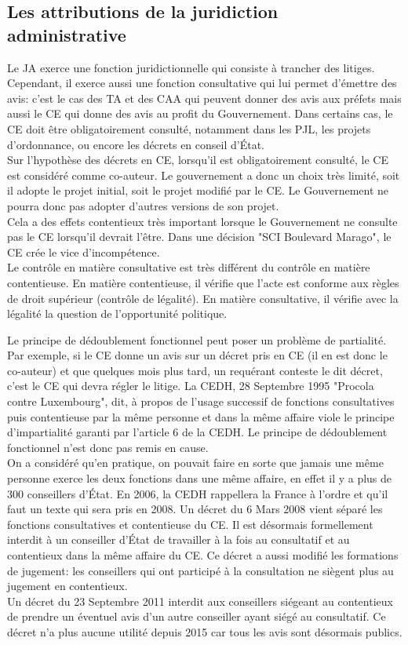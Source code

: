\documentclass[10pt, a4paper, openany]{book}
\begin{document}
\subsection{Les attributions de la juridiction administrative}

Le JA exerce une fonction juridictionnelle qui consiste à trancher des litiges. Cependant, il exerce aussi une fonction consultative qui lui permet d'émettre des avis: c'est le cas des TA et des CAA qui peuvent donner des avis aux préfets mais aussi le CE qui donne des avis au profit du Gouvernement. Dans certains cas, le CE doit être obligatoirement consulté, notamment dans les PJL, les projets d'ordonnance, ou encore les décrets en conseil d'État. \\
Sur l'hypothèse des décrets en CE, lorsqu'il est obligatoirement consulté, le CE est considéré comme co-auteur. Le gouvernement a donc un choix très limité, soit il adopte le projet initial, soit le projet modifié par le CE. Le Gouvernement ne pourra donc pas adopter d'autres versions de son projet. \\
Cela a des effets contentieux très important lorsque le Gouvernement ne consulte pas le CE lorsqu'il devrait l'être. Dans une décision "SCI Boulevard Marago", le CE crée le vice d'incompétence. \\
Le contrôle en matière consultative est très différent du contrôle en matière contentieuse. En matière contentieuse, il vérifie que l'acte est conforme aux règles de droit supérieur (contrôle de légalité). En matière consultative, il vérifie avec la légalité la question de l'opportunité politique. 


Le principe de dédoublement fonctionnel peut poser un problème de partialité. Par exemple, si le CE donne un avis sur un décret pris en CE (il en est donc le co-auteur) et que quelques mois plus tard, un requérant conteste le dit décret, c'est le CE qui devra régler le litige. La CEDH, 28 Septembre 1995 "Procola contre Luxembourg", dit, à propos de l'usage successif de fonctions consultatives puis contentieuse par la même personne et dans la même affaire viole le principe d'impartialité garanti par l'article 6 de la CEDH. Le principe de dédoublement fonctionnel n'est donc pas remis en cause. \\
On a considéré qu'en pratique, on pouvait faire en sorte que jamais une même personne exerce les deux fonctions dans une même affaire, en effet il y a plus de 300 conseillers d'État. En 2006, la CEDH rappellera la France à l'ordre et qu'il faut un texte qui sera pris en 2008. Un décret du 6 Mars 2008 vient séparé les fonctions consultatives et contentieuse du CE. Il est désormais formellement interdit à un conseiller d'État de travailler à la fois au consultatif et au contentieux dans la même affaire du CE. Ce décret a aussi modifié les formations de jugement: les conseillers qui ont participé à la consultation ne siègent plus au jugement en contentieux. \\
Un décret du 23 Septembre 2011 interdit aux conseillers siégeant au contentieux de prendre un éventuel avis d'un autre conseiller ayant siégé au consultatif. Ce décret n'a plus aucune utilité depuis 2015 car tous les avis sont désormais publics. 
\end{document}
